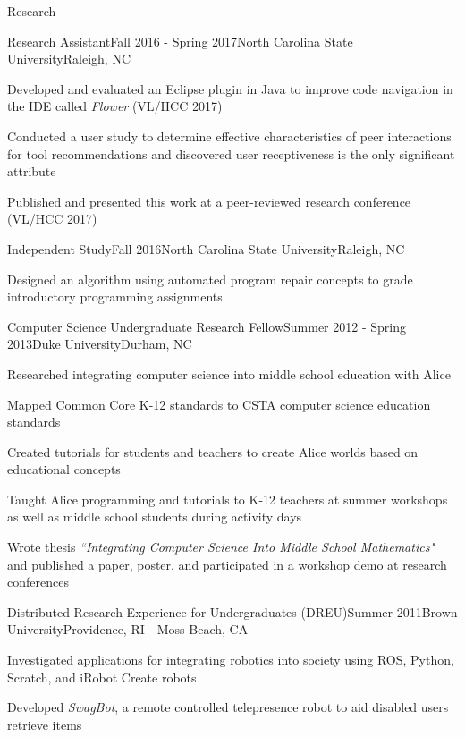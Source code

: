 \documentclass{resume} %
\begin{document}
\begin{rSection}{Research}
\begin{rSubsection}{Research Assistant}{Fall 2016 - Spring 2017}{North Carolina State University}{Raleigh, NC}
\item Developed and evaluated an Eclipse plugin in Java to improve code navigation in the IDE called \textit{Flower} (VL/HCC 2017)
\item Conducted a user study to determine effective characteristics of peer interactions for tool recommendations and discovered user receptiveness is the only significant attribute
\item Published and presented this work at a peer-reviewed research conference (VL/HCC 2017)
\end{rSubsection}
\vspace{-5pt}

\begin{rSubsection}{Independent Study}{Fall 2016}{North Carolina State University}{Raleigh, NC}
\item Designed an algorithm using automated program repair concepts to grade introductory programming assignments
\end{rSubsection}
\vspace{-5pt}

\begin{rSubsection}{Computer Science Undergraduate Research Fellow}{Summer 2012 - Spring 2013}{Duke University}{Durham, NC}
\item Researched integrating computer science into middle school education with Alice
\item Mapped Common Core K-12 standards to CSTA computer science education standards
\item Created tutorials for students and teachers to create Alice worlds based on educational concepts
\item Taught Alice programming and tutorials to K-12 teachers at summer workshops as well as middle school students during activity days
\item Wrote thesis \textit{``Integrating Computer Science Into Middle School Mathematics"} and published a paper, poster, and participated in a workshop demo at research conferences
\end{rSubsection}
\vspace{-5pt}

\begin{rSubsection}{Distributed Research Experience for Undergraduates (DREU)}{Summer 2011}{Brown University}{Providence, RI - Moss Beach, CA}
\item Investigated applications for integrating robotics into society using ROS, Python, Scratch, and iRobot Create robots
\item Developed \textsl{SwagBot}, a remote controlled telepresence robot to aid disabled users retrieve items
\end{rSubsection}

\end{rSection}
\end{document}
